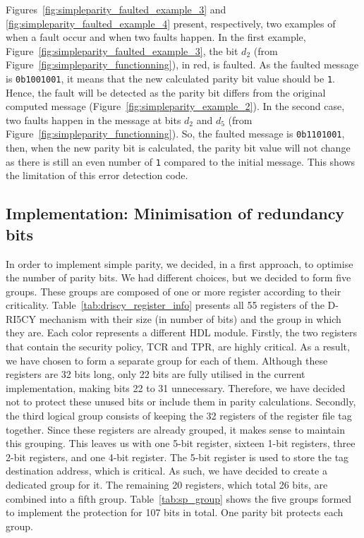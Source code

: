 Figures~\ref{fig:simpleparity_faulted_example_3} and \ref{fig:simpleparity_faulted_example_4} present, respectively, two examples of when a fault occur and when two faults happen.
In the first example, Figure~\ref{fig:simpleparity_faulted_example_3}, the bit $d_2$ (from Figure~\ref{fig:simpleparity_functionning}), in red, is faulted. As the faulted message is \texttt{0b1001001}, it means that the new calculated parity bit value should be \texttt{1}. Hence, the fault will be detected as the parity bit differs from the original computed message (Figure~\ref{fig:simpleparity_example_2}).
In the second case, two faults happen in the message at bits $d_2$ and $d_5$ (from Figure~\ref{fig:simpleparity_functionning}). So, the faulted message is \texttt{0b1101001}, then, when the new parity bit is calculated, the parity bit value will not change as there is still an even number of \texttt{1} compared to the initial message. This shows the limitation of this error detection code.

\subsection{Implementation: Minimisation of redundancy bits}

In order to implement simple parity, we decided, in a first approach, to optimise the number of parity bits. We had different choices, but we decided to form five groups. These groups are composed of one or more register according to their criticality. Table~\ref{tab:driscy_register_info} presents all 55 registers of the D-RI5CY mechanism with their size (in number of bits) and the group in which they are. Each color represents a different HDL module.
Firstly, the two registers that contain the security policy, TCR and TPR, are highly critical. As a result, we have chosen to form a separate group for each of them. Although these registers are 32 bits long, only 22 bits are fully utilised in the current implementation, making bits 22 to 31 unnecessary. Therefore, we have decided not to protect these unused bits or include them in parity calculations.
Secondly, the third logical group consists of keeping the 32 registers of the register file tag together. Since these registers are already grouped, it makes sense to maintain this grouping.
This leaves us with one 5-bit register, sixteen 1-bit registers, three 2-bit registers, and one 4-bit register. The 5-bit register is used to store the tag destination address, which is critical. As such, we have decided to create a dedicated group for it. The remaining 20 registers, which total 26 bits, are combined into a fifth group.
Table~\ref{tab:sp_group} shows the five groups formed to implement the protection for 107 bits in total. One parity bit protects each group.

